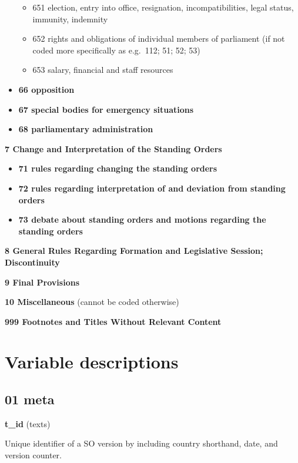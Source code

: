 \documentclass[]{article}
\providecommand{\tightlist}{%
  \setlength{\itemsep}{0pt}\setlength{\parskip}{0pt}}
\begin{document}
\begin{itemize}
  \begin{itemize}
  \tightlist
  \item
    651 election, entry into office, resignation, incompatibilities,
    legal status, immunity, indemnity
  \item
    652 rights and obligations of individual members of parliament (if
    not coded more specifically as e.g.~112; 51; 52; 53)
  \item
    653 salary, financial and staff resources
  \end{itemize}
\item
  \textbf{66 opposition}
\item
  \textbf{67 special bodies for emergency situations}
\item
  \textbf{68 parliamentary administration}
\end{itemize}

\textbf{7 Change and Interpretation of the Standing Orders}

\begin{itemize}
\tightlist
\item
  \textbf{71 rules regarding changing the standing orders}
\item
  \textbf{72 rules regarding interpretation of and deviation from
  standing orders}
\item
  \textbf{73 debate about standing orders and motions regarding the
  standing orders}
\end{itemize}

\textbf{8 General Rules Regarding Formation and Legislative Session;
Discontinuity}

\textbf{9 Final Provisions}

\textbf{10 Miscellaneous} (cannot be coded otherwise)

\textbf{999 Footnotes and Titles Without Relevant Content}

\section{Variable descriptions}\label{variable-descriptions}

\subsection{01 meta}\label{meta}

\textbf{t\_id} (texts)

Unique identifier of a SO version by including country shorthand, date,
and version counter.
\end{document}
